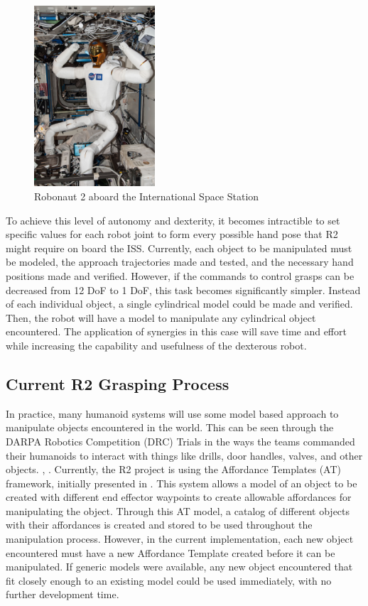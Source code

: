 \documentclass[runningheads,a4paper]{llncs}
\begin{document}
   \begin{figure}[t]
      \centering
      \includegraphics[width=0.4\textwidth]{r2_iss}
      \caption{Robonaut 2 aboard the International Space Station}
      \label{at_r2_iss}
   \end{figure}

To achieve this level of autonomy and dexterity, it becomes intractible to set specific values for each robot joint to form every possible hand pose that R2 might require on board the ISS. Currently, each object to be manipulated must be modeled, the approach trajectories made and tested, and the necessary hand positions made and verified. However, if the commands to control grasps can be decreased from 12 DoF to 1 DoF, this task becomes significantly simpler. Instead of each individual object, a single cylindrical model could be made and verified. Then, the robot will have a model to manipulate any cylindrical object encountered. The application of synergies in this case will save time and effort while increasing the capability and usefulness of the dexterous robot.   


\subsection{Current R2 Grasping Process}

In practice, many humanoid systems will use some model based approach to manipulate objects encountered in the world. This can be seen through the DARPA Robotics Competition (DRC) Trials in the ways the teams commanded their humanoids to interact with things like drills, door handles, valves, and other objects. \cite{DRC_Yanco}, \cite{IHMC}. Currently, the R2 project is using the Affordance Templates (AT) framework, initially presented in \cite{affordance_templates}. This system allows a model of an object to be created with different end effector waypoints to create allowable affordances for manipulating the object. Through this AT model, a catalog of different objects with their affordances is created and stored to be used throughout the manipulation process. However, in the current implementation, each new object encountered must have a new Affordance Template created before it can be manipulated. If generic models were available, any new object encountered that fit closely enough to an existing model could be used immediately, with no further development time. 
\end{document}
